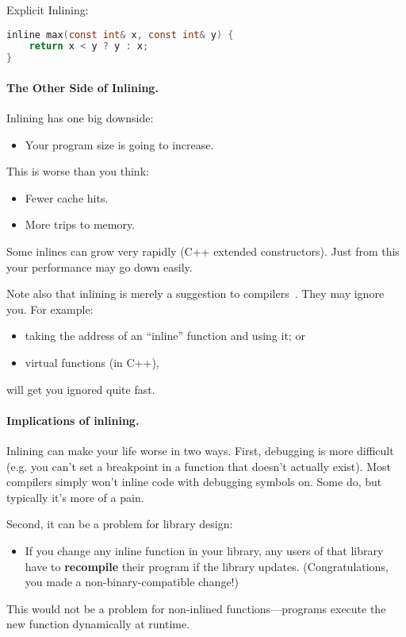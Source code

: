 Explicit Inlining:
  \begin{lstlisting}[language=C]
inline max(const int& x, const int& y) {
    return x < y ? y : x;
}
  \end{lstlisting}

\paragraph{The Other Side of Inlining.}
Inlining has one big downside:
  \begin{itemize}
    \item Your program size is going to increase.
  \end{itemize}
   This is worse than you think:
      \begin{itemize}
        \item Fewer cache hits.
        \item More trips to memory.
      \end{itemize}
   Some inlines can grow very rapidly (C++ extended constructors).
  Just from this your performance may go down easily.

  Note also that inlining is merely a suggestion to compilers~\cite{gcc:inlining}.
  They may ignore you.
  For example:
  \begin{itemize}
    \item taking the address of an ``inline'' function and using it; or
    \item virtual functions (in C++),
  \end{itemize}
  will get you ignored quite fast.

\paragraph{Implications of inlining.} Inlining can make your life worse in two ways.
First, debugging is more difficult (e.g. you can't set a breakpoint in a function that
  doesn't actually exist).
 Most compilers simply won't inline code with debugging symbols on.
 Some do, but typically it's more of a pain.

Second, it can be a problem for library design:
  \begin{itemize}
    \item If you change any inline function in your library, any users
      of that library have to {\bf recompile} their program if the
      library updates. (Congratulations, you made a non-binary-compatible change!)
  \end{itemize}
This would not be a problem for non-inlined functions---programs execute the new function
dynamically at runtime.

